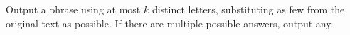 

Output a phrase using at most $k$ distinct letters, substituting as few from the
original text as possible. If there are multiple possible answers, output any.
